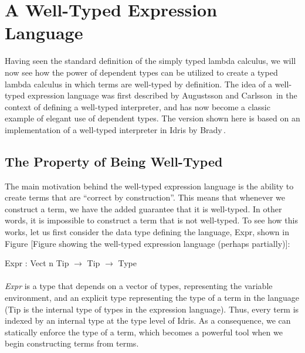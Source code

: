 \section{A Well-Typed Expression Language}
\label{sec:a-well-typed-expression-language}


Having seen the standard definition of the simply typed lambda calculus, we will now see how the power of dependent types can be utilized to create a typed lambda calculus in which terms are well-typed by definition. The idea of a well-typed expression language was first described by Augustsson and Carlsson\,\cite{Augustsson99anexercise} in the context of defining a well-typed interpreter, and has now become a classic example of elegant use of dependent types. The version shown here is based on an implementation of a well-typed interpreter in Idris by Brady\,\cite{Brady:IdrisTutorial}.

\subsection{The Property of Being Well-Typed}
The main motivation behind the well-typed expression language is the ability to create terms that are ``correct by construction''. This means that whenever we construct a term, we have the added guarantee that it is well-typed. In other words, it is impossible to construct a term that is not well-typed. To see how this works, let us first consider the data type defining the language, Expr, shown in Figure [Figure showing the well-typed expression language (perhaps partially)]:

\begin{center}
Expr : Vect n Tip $\rightarrow$ Tip $\rightarrow$ Type
\end{center}

\paragraph{}
\textit{Expr} is a type that depends on a vector of types, representing the variable environment, and an explicit type representing the type of a term in the language (Tip is the internal type of types in the expression language). Thus, every term is indexed by an internal type at the type level of Idris. As a consequence, we can statically enforce the type of a term, which becomes a powerful tool when we begin constructing terms from terms.

